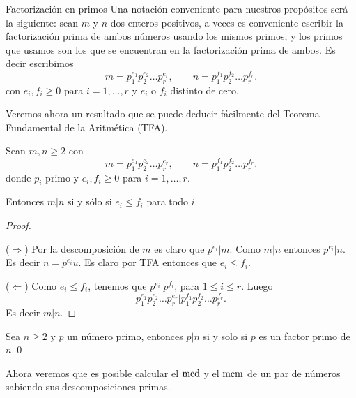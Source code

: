 \begin{section}{Factorización en primos}
Una notación conveniente para nuestros propósitos será la siguiente: sean $m$ y $n$ dos enteros positivos, a veces es conveniente escribir la factorización prima de ambos números usando los mismos primos, y los primos que usamos son los que se encuentran en la factorización prima de ambos. Es decir  escribimos
$$
m=p_1^{e_1}p_2^{e_2}\ldots p_r^{e_r},\qquad
n=p_1^{f_1}p_2^{f_2}\ldots p_r^{f_r}.
$$
con $e_i,f_i \ge 0$ para $i=1,\ldots,r$ y $e_i$ o $f_i$ distinto de cero. 
 
Veremos ahora un resultado que se puede deducir fácilmente del Teorema Fundamental de la Aritmética (TFA).

\begin{proposicion} Sean $m,n \ge2$ con
$$
m=p_1^{e_1}p_2^{e_2}\ldots p_r^{e_r},\qquad
n=p_1^{f_1}p_2^{f_2}\ldots p_r^{f_r}.
$$
donde $p_i$ primo y $e_i,f_i \ge 0$ para $i=1,\ldots,r$. 

Entonces $m|n$ si y sólo si $e_i \le f_i$ para todo $i$.
\end{proposicion}
\begin{proof}
\
    
\noindent($\Rightarrow$) Por la descomposición de $m$ es claro que $p^{e_i}|m$. Como $m|n$ entonces   $p^{e_i}|n$. Es decir $n =  p^{e_i}u$. Es claro por TFA entonces que $e_i \le f_i$.

\noindent($\Leftarrow$) Como $e_i \le f_i$, tenemos que $p^{e_i}|p^{f_i}$, para $1 \le i \le r$.  Luego  $$p_1^{e_1}p_2^{e_2}\ldots p_r^{e_r}| p_1^{f_1}p_2^{f_2}\ldots p_r^{f_r}.$$ Es decir $m|n$.
\end{proof}

\begin{corolario}
    Sea $n \ge 2$ y $p$ un número primo,  entonces $p|n$ si y solo si $p$ es un factor primo de $n$.\qed
\end{corolario}



%


Ahora veremos que es posible calcular el $\operatorname{mcd}$ y el $\operatorname{mcm}$ de un par de números sabiendo sus descomposiciones primas.


\end{section}

